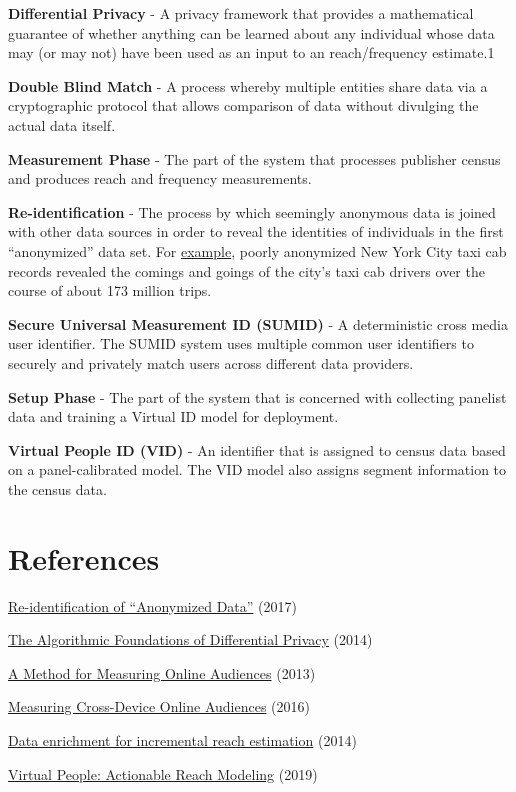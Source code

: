 \documentclass[]{article}
\providecommand{\tightlist}{%
  \setlength{\itemsep}{0pt}\setlength{\parskip}{0pt}}
\begin{document}
\textbf{Differential Privacy} - A privacy framework that provides a mathematical guarantee of whether anything can be learned about any individual whose data may (or may not) have been used as an input to an reach/frequency estimate.1

\textbf{Double Blind Match} - A process whereby multiple entities share data via a cryptographic protocol that allows comparison of data without divulging the actual data itself.

\textbf{Measurement Phase} - The part of the system that processes publisher census and produces reach and frequency measurements.

\textbf{Re-identification} - The process by which seemingly anonymous data is joined with other data sources in order to reveal the identities of individuals in the first ``anonymized'' data set. For \href{https://arstechnica.com/tech-policy/2014/06/poorly-anonymized-logs-reveal-nyc-cab-drivers-detailed-whereabouts/}{example}, poorly anonymized New York City taxi cab records revealed the comings
and goings of the city's taxi cab drivers over the course of about 173 million trips.

\textbf{Secure Universal Measurement ID (SUMID)} - A deterministic cross media user identifier. The SUMID system uses multiple common user identifiers to securely and privately match users across different data
providers.

\textbf{Setup Phase} - The part of the system that is concerned with collecting panelist data and training a Virtual ID model for deployment.

\textbf{Virtual People ID (VID)} - An identifier that is assigned to census data based on a panel-calibrated model. The VID model also assigns segment information to the census data.


\section{References}

\begin{enumerate}[label={[\arabic*]}]

\tightlist
\item
  \href{https://georgetownlawtechreview.org/wp-content/uploads/2017/04/Lubarsky-1-GEO.-L.-TECH.-REV.-202.pdf}{Re-identification of ``Anonymized Data''} (2017) \label{ref:1}
\item
  \href{https://www.cis.upenn.edu/~aaroth/Papers/privacybook.pdf}{The Algorithmic Foundations of Differential Privacy} (2014) \label{ref:2}
\item
  \href{https://research.google/pubs/pub41089/}{A Method for Measuring Online Audiences} (2013) \label{ref:3}
\item
  \href{https://research.google/pubs/pub45353/}{Measuring Cross-Device Online Audiences} (2016) \label{ref:4}
\item
  \href{https://research.google/pubs/pub42246/}{Data enrichment for incremental reach estimation} (2014) \label{ref:5}
\item
  \href{https://research.google/pubs/pub48387/}{Virtual People: Actionable Reach Modeling} (2019) \label{ref:6}
\end{enumerate}
\end{document}
